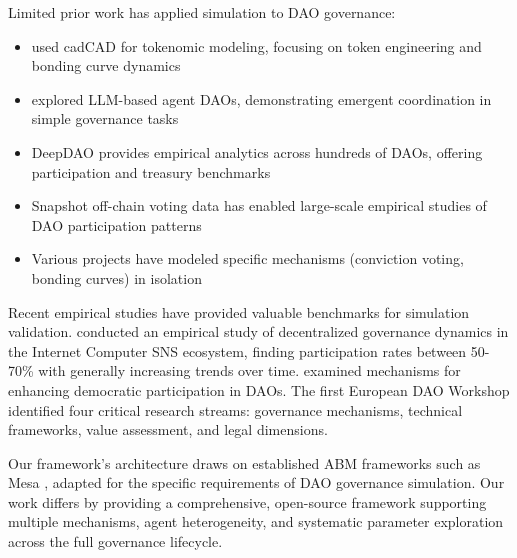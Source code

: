 Limited prior work has applied simulation to DAO governance:

\begin{itemize}
    \item \citet{faqir2021cadcad} used cadCAD for tokenomic modeling, focusing on token engineering and bonding curve dynamics
    \item \citet{tan2023agentdao} explored LLM-based agent DAOs, demonstrating emergent coordination in simple governance tasks
    \item DeepDAO \citep{deepdao2023analytics} provides empirical analytics across hundreds of DAOs, offering participation and treasury benchmarks
    \item Snapshot \citep{snapshot2021governance} off-chain voting data has enabled large-scale empirical studies of DAO participation patterns
    \item Various projects have modeled specific mechanisms (conviction voting, bonding curves) in isolation
\end{itemize}

Recent empirical studies have provided valuable benchmarks for simulation validation. \citet{kiayias2024democracy} conducted an empirical study of decentralized governance dynamics in the Internet Computer SNS ecosystem, finding participation rates between 50-70\% with generally increasing trends over time. \citet{rozas2024democratic} examined mechanisms for enhancing democratic participation in DAOs. The first European DAO Workshop \citep{dawo2025trends} identified four critical research streams: governance mechanisms, technical frameworks, value assessment, and legal dimensions.

Our framework's architecture draws on established ABM frameworks such as Mesa \citep{mesa2023framework}, adapted for the specific requirements of DAO governance simulation. Our work differs by providing a comprehensive, open-source framework supporting multiple mechanisms, agent heterogeneity, and systematic parameter exploration across the full governance lifecycle.
